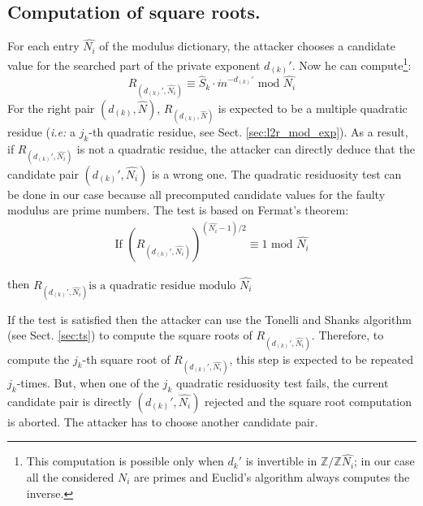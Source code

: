 \documentclass{article}
\begin{document}
\subsection{Computation of square roots.}
\label{sec:sqroots}
For each entry $\hat{N_i}$ of the modulus dictionary, the attacker
chooses a candidate value for the searched part of the private
exponent $d_{(k)}'$. Now he can compute\footnote[3]{This computation
  is possible only when $d_{k}'$ is invertible in
  $\mathbb{Z}/\mathbb{Z}\hat{N_i}$; in our case all the considered
  $N_i$ are primes and Euclid's algorithm always computes the inverse.}:
\begin{equation}
 \label{eq:comp_r}
 R_{(d_{(k)}',\hat{N_i})} \equiv \hat{S}_{k} \cdot \dot{m}^{-d_{(k)}'} \mbox{ mod } \hat{N_i}
\end{equation}
For the right pair $(d_{(k)},\hat{N})$, $R_{(d_{(k)},\hat{N})}$ is expected to be a multiple quadratic residue (\textit{i.e:} a $j_k$-th quadratic residue, see Sect. \ref{sec:l2r_mod_exp}).
As a result, if $R_{(d_{(k)}',\hat{N_i})}$ is not a quadratic residue, the attacker can directly deduce that the candidate pair $(d_{(k)}',\hat{N_i})$ is a wrong one. The quadratic residuosity test can be done in our case because all precomputed candidate values for the faulty modulus are prime numbers. The test is based on Fermat's theorem:
\begin{eqnarray}
 \mbox{If } {\left(R_{(d_{(k)}',\hat{N_i})}\right)}^{\left(\hat{N_i}-1\right)/2 } \equiv 1 \mbox{ mod } \hat{N_i}
\end{eqnarray}
\begin{center}
then $R_{(d_{(k)}',\hat{N_i})} \mbox{is a quadratic residue modulo }\hat{N_i}$ 
\end{center}
If the test is satisfied then the attacker can use the Tonelli and Shanks algorithm (see Sect. \ref{sec:ts}) to compute the square roots of $R_{(d_{(k)}',\hat{N_i})}$. 
Therefore, to compute the $j_k$-th square root of $R_{(d_{(k)}',\hat{N_i})}$, this step is expected to be repeated $j_k$-times. But, when one of the $j_k$ quadratic residuosity test fails, the current candidate pair is directly $(d_{(k)}',\hat{N_i})$ rejected and the square root computation is aborted. The attacker has to choose another candidate pair.
\end{document}
